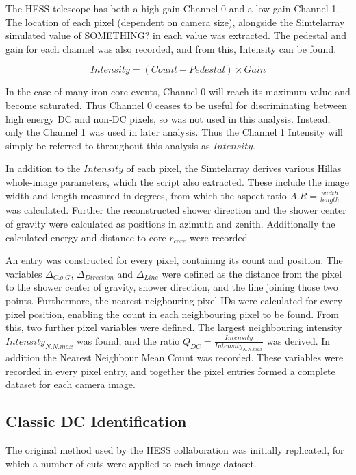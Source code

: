 \documentclass[]{article}
\begin{document}
The HESS telescope has both a high gain Channel 0 and a low gain Channel 1. The location of each pixel (dependent on camera size), alongside the Sim\textunderscore telarray simulated value of SOMETHING? in each value was extracted. The pedestal and gain for each channel was also recorded, and from this, Intensity can be found.

\[ Intensity = (Count - Pedestal)\times Gain \]

In the case of many iron core events, Channel 0 will reach its maximum value and become saturated. Thus Channel 0 ceases to be useful for discriminating between high energy DC and non-DC pixels, so was not used in this analysis. Instead, only the Channel 1 was used in later analysis. Thus the Channel 1 Intensity will simply be referred to throughout this analysis as $Intensity$. 

In addition to the $Intensity$ of each pixel, the Sim\textunderscore telarray derives various Hillas whole-image parameters, which the script also extracted. These include the image width and length measured in degrees, from which the aspect ratio $A.R = \frac{width}{length}$ was calculated. Further the reconstructed shower direction and the shower center of gravity were calculated as positions in azimuth and zenith. Additionally the calculated energy and distance to core $r_{core}$ were recorded.

An entry was constructed for every pixel, containing its count and position. The variables $ \Delta_{C.o.G}$, $\Delta_{Direction}$ and $\Delta_{Line}$ were defined as the distance from the pixel to the shower center of gravity, shower direction, and the line joining those two points. Furthermore, the nearest neigbouring pixel IDs were calculated for every pixel position, enabling the count in each neighbouring pixel to be found. From this, two further pixel variables were defined. The largest neighbouring intensity $Intensity_{N.N.max}$ was found, and the ratio $ Q_{DC} = \frac{Intensity}{Intensity_{N.N.max}} $ was derived. In addition the Nearest Neighbour Mean Count was recorded. These variables were recorded in every pixel entry, and together the pixel entries formed a complete dataset for each camera image.

\subsection{Classic DC Identification}
The original method used by the HESS collaboration \cite{hess07} was initially replicated, for which a number of cuts were applied to each image dataset.
\end{document}
